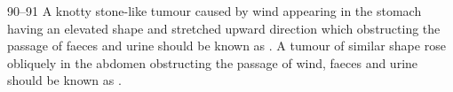 \begin{translation}
\item[90--91] A knotty stone-like tumour caused by wind appearing in the stomach having an elevated shape and stretched upward direction which obstructing the passage of faeces and urine should be known as . A tumour of similar shape rose obliquely in the abdomen obstructing the passage of wind, faeces and urine should be known as . 



















 




\end{translation}